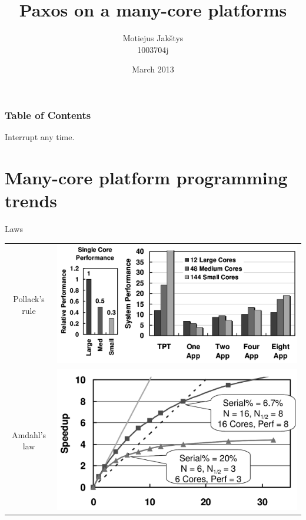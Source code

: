 \documentclass[14pt]{beamer}
\title{Paxos on a many-core platforms}
\author{Motiejus Jak\v{s}tys \\
1003704j}
\date{March 2013}
\begin{document}
\begin{frame}[plain]
    \titlepage
\end{frame}

\begin{frame}
    \frametitle{Table of Contents}
    \tableofcontents
    \hfill
    Interrupt any time.
\end{frame}

\section{Many-core platform programming trends}

\begin{frame}{Laws}
    \pause
    \begin{tabular}{cm{0cm}}
            Pollack's rule &
            \pause
            \includegraphics[height=0.4\textheight]{images/pollack.png}
            \\
            Amdahl's law &
            \pause
            \includegraphics[height=0.4\textheight]{images/amdahl.png} \\
    \end{tabular}
\end{frame}
\end{document}
